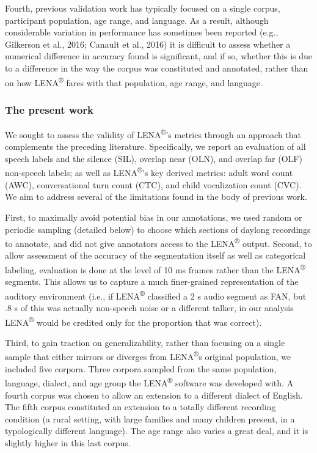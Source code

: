 \documentclass[english,table,man,floatsintext]{apa6}
\begin{document}
Fourth, previous validation work has typically focused on a single corpus, participant population, age range, and language. As a result, although considerable variation in performance has sometimes been reported (e.g., Gilkerson et al., 2016; Canault et al., 2016) it is difficult to assess whether a numerical difference in accuracy found is significant, and if so, whether this is due to a difference in the way the corpus was constituted and annotated, rather than on how LENA\textsuperscript{®} fares with that population, age range, and language.

\hypertarget{the-present-work}{%
\subsubsection{The present work}\label{the-present-work}}

We sought to assess the validity of LENA\textsuperscript{®}'s metrics through an approach that complements the preceding literature. Specifically, we report an evaluation of all speech labels and the silence (SIL), overlap near (OLN), and overlap far (OLF) non-speech labels; as well as LENA\textsuperscript{®}'s key derived metrics: adult word count (AWC), conversational turn count (CTC), and child vocalization count (CVC). We aim to address several of the limitations found in the body of previous work.

First, to maximally avoid potential bias in our annotations, we used random or periodic sampling (detailed below) to choose which sections of daylong recordings to annotate, and did not give annotators access to the LENA\textsuperscript{®} output. Second, to allow assessment of the accuracy of the segmentation itself as well as categorical labeling, evaluation is done at the level of 10 ms frames rather than the LENA\textsuperscript{®} segments. This allows us to capture a much finer-grained representation of the auditory environment (i.e., if LENA\textsuperscript{®} classified a 2 s audio segment as FAN, but .8 s of this was actually non-speech noise or a different talker, in our analysis LENA\textsuperscript{®} would be credited only for the proportion that was correct).

Third, to gain traction on generalizability, rather than focusing on a single sample that either mirrors or diverges from LENA\textsuperscript{®}s original population, we included five corpora. Three corpora sampled from the same population, language, dialect, and age group the LENA\textsuperscript{®} software was developed with. A fourth corpus was chosen to allow an extension to a different dialect of English. The fifth corpus constituted an extension to a totally different recording condition (a rural setting, with large families and many children present, in a typologically different language). The age range also varies a great deal, and it is slightly higher in this last corpus.
\end{document}
